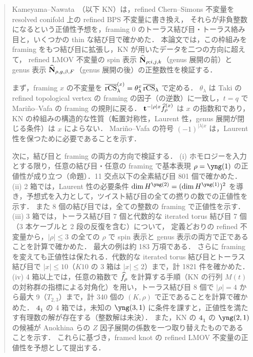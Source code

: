 \begin{abstract}
Kameyama--Nawata~\cite{Kameyama17}（以下 KN）は，refined Chern--Simons 不変量を resolved conifold 上の refined BPS 不変量に書き換え，
それらが非負整数になるという正値性予想を，framing 0 のトーラス結び目・トーラス絡み目と，いくつかの thin な結び目で確かめた．
本論文では，この枠組みを framing をもつ結び目に拡張し，KN が用いたデータを二つの方向に超えて，
refined LMOV 不変量の spin 表示 $\hbN_{\rho;i,j,k}$（genus 展開の前）と genus 表示 $\hbN_{\rho,g,\beta,F}$（genus 展開の後）の正整数性を検証する．

まず，framing $x$ の不変量を $\overline{\rCS}^{(x)}_\lambda=\theta_\lambda^x\,\overline{\rCS}_\lambda$ で定める．
$\theta_\lambda$ は Taki の refined topological vertex の framing の因子（の逆数）に一致し，$t=q$ で Mariño--Vafa の framing の規則に戻る．
$\bt^{-|\rho|x}\hf^{(x)}_\rho$ は $x$ の指数和であり，KN の枠組みの構造的な性質（転置対称性，Laurent 性，genus 展開が閉じる条件）は $x$ によらない．
Mariño--Vafa の符号 $(-1)^{|\lambda|x}$ は，Laurent 性を保つために必要であることを示す．

次に，結び目と framing の両方の方向で検証する．
(i) ホモロジーを入力とする限り，任意の結び目・任意の framing で基本表現 $\rho=\yng(1)$ の正値性が成り立つ（命題）．11 交点以下の全素結び目 801 個で確かめた．
(ii) 2 箱では，Laurent 性の必要条件 $\dim H^{\yng(2)}=(\dim H^{\yng(1)})^2$ を導き，予想式を入力として，ツイスト結び目の全ての撚りの数での正値性を示す．
また 8 個の結び目では，全ての整数の framing で正値性を示す．
(iii) 3 箱では，トーラス結び目 7 個と代数的な iterated torus 結び目 7 個（3 本ケーブルと 2 段の反復を含む）について，
定義どおりの refined 不変量から，$|\rho|\le 3$ の全ての $\rho$ で spin 表示と genus 表示の両方で正であることを計算で確かめた．
最大の例は約 183 万項である．
さらに framing を変えても正値性は保たれる．代数的な iterated torus 結び目とトーラス結び目で $|x|\le10$（$K10$ の 3 箱は $|x|\le2$）まで，計 1821 件を確かめた．
(iv) 4 箱以上では，任意の箱数で $\hf_\rho$ を計算する手順（KN の行列 $M(t)$ の対称群の指標による対角化）を用い，トーラス結び目 8 個で $|\rho|=4$ から最大 9（$T_{2,3}$）まで，計 340 個の $(K,\rho)$ で正であることを計算で確かめた．
$\mathbf{4_1}$ の 4 箱では，未知の $\yng(3,1)$ に条件を課すと，正値性を満たす有理数の解が存在する（整数解は未決）．
また，KN の $\mathbf{4_1}$ の $\yng(2,1)$ の候補が Anokhina らの $Z$ 因子展開の係数を一つ取り替えたものであることを示す．
これらに基づき，framed knot の refined LMOV 不変量の正値性を予想として提出する．
\end{abstract}
